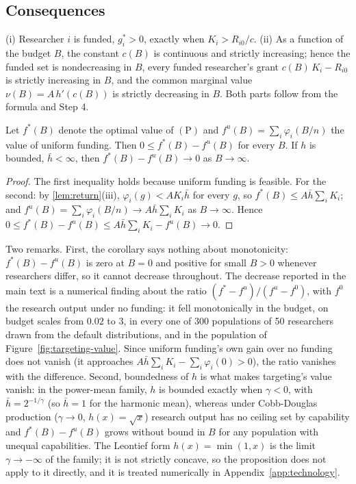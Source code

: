 \subsection*{Consequences}

\begin{corollary}\label{cor:frontier}
(i) Researcher $i$ is funded, $g_i^* > 0$, exactly when $K_i > R_{i0}/c$. (ii) As a function of the budget $B$, the constant $c(B)$ is continuous and strictly increasing; hence the funded set is nondecreasing in $B$, every funded researcher's grant $c(B)\,K_i - R_{i0}$ is strictly increasing in $B$, and the common marginal value $\nu(B) = A\,h'(c(B))$ is strictly decreasing in $B$. Both parts follow from the formula and Step 4.
\end{corollary}
\begin{corollary}\label{cor:targeting-vanishes}
Let $f^*(B)$ denote the optimal value of $(\mathrm{P})$ and $f^u(B) = \sum_i \varphi_i(B/n)$ the value of uniform funding. Then $0 \leq f^*(B) - f^u(B)$ for every $B$. If $h$ is bounded, $\bar h < \infty$, then $f^*(B) - f^u(B) \to 0$ as $B \to \infty$.
\end{corollary}

\begin{proof}
The first inequality holds because uniform funding is feasible. For the second: by \cref{lem:return}(iii), $\varphi_i(g) < A K_i \bar h$ for every $g$, so $f^*(B) \leq A\bar h\sum_i K_i$; and $f^u(B) = \sum_i \varphi_i(B/n) \to A\bar h\sum_i K_i$ as $B \to \infty$. Hence $0 \leq f^*(B) - f^u(B) \leq A\bar h\sum_i K_i - f^u(B) \to 0$.
\end{proof}

Two remarks. First, the corollary says nothing about monotonicity: $f^*(B) - f^u(B)$ is zero at $B = 0$ and positive for small $B > 0$ whenever researchers differ, so it cannot decrease throughout. The decrease reported in the main text is a numerical finding about the ratio $(f^* - f^u)/(f^u - f^0)$, with $f^0$ the research output under no funding: it fell monotonically in the budget, on budget scales from $0.02$ to $3$, in every one of 300 populations of 50 researchers drawn from the default distributions, and in the population of Figure~\ref{fig:targeting-value}. Since uniform funding's own gain over no funding does not vanish (it approaches $A\bar h\sum_i K_i - \sum_i \varphi_i(0) > 0$), the ratio vanishes with the difference. Second, boundedness of $h$ is what makes targeting's value vanish: in the power-mean family, $h$ is bounded exactly when $\gamma < 0$, with $\bar h = 2^{-1/\gamma}$ (so $\bar h = 1$ for the harmonic mean), whereas under Cobb-Douglas production ($\gamma \to 0$, $h(x) = \sqrt{x}$) research output has no ceiling set by capability and $f^*(B) - f^u(B)$ grows without bound in $B$ for any population with unequal capabilities. The Leontief form $h(x) = \min(1, x)$ is the limit $\gamma \to -\infty$ of the family; it is not strictly concave, so the proposition does not apply to it directly, and it is treated numerically in Appendix~\ref{app:technology}.

